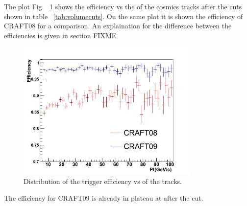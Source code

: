 




The plot Fig. ~\ref{fig:eff_pt_09_vs_08} shows the efficiency vs the
\pt of the cosmics tracks after the cuts shown in table
~\ref{tab:volumecuts}. On the same plot it is shown 
the efficiency of CRAFT08 for a comparison.
An explaination for the difference between the efficiencies
is given in section FIXME 


\begin{figure}[hbtp]
  \begin{center}
    \includegraphics[width=0.8\textwidth]{eff_pt_09_vs_08}
    \hspace{1cm}
    \caption{Distribution of the trigger efficiency vs \pt of the tracks.}
    \label{fig:eff_pt_09_vs_08}
  \end{center}
\end{figure}


The efficiency for CRAFT09 is already in plateau at after the cut.%






